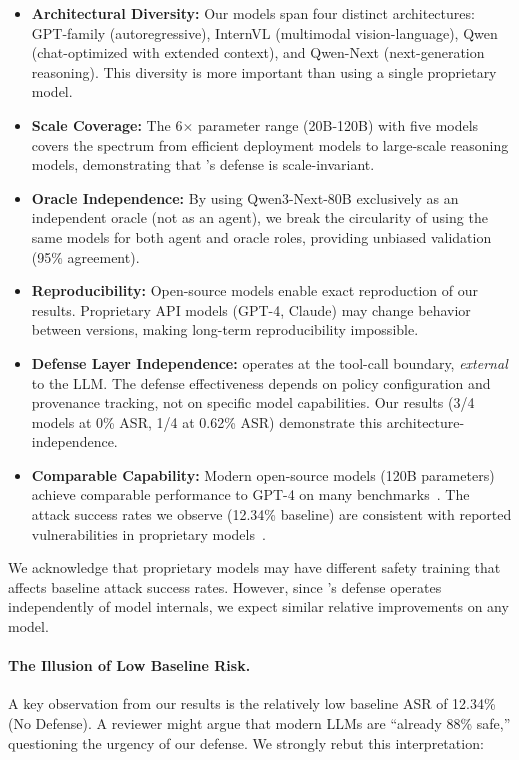 \begin{itemize}[leftmargin=1.2em]
  \item \textbf{Architectural Diversity:} Our models span four distinct architectures: GPT-family (autoregressive), InternVL (multimodal vision-language), Qwen (chat-optimized with extended context), and Qwen-Next (next-generation reasoning). This diversity is more important than using a single proprietary model.
  
  \item \textbf{Scale Coverage:} The 6$\times$ parameter range (20B-120B) with five models covers the spectrum from efficient deployment models to large-scale reasoning models, demonstrating that \sys{}'s defense is scale-invariant.
  
  \item \textbf{Oracle Independence:} By using Qwen3-Next-80B exclusively as an independent oracle (not as an agent), we break the circularity of using the same models for both agent and oracle roles, providing unbiased validation (95\% agreement).
  
  \item \textbf{Reproducibility:} Open-source models enable exact reproduction of our results. Proprietary API models (GPT-4, Claude) may change behavior between versions, making long-term reproducibility impossible.
  
  \item \textbf{Defense Layer Independence:} \sys{} operates at the tool-call boundary, \emph{external} to the LLM. The defense effectiveness depends on policy configuration and provenance tracking, not on specific model capabilities. Our results (3/4 models at 0\% ASR, 1/4 at 0.62\% ASR) demonstrate this architecture-independence.
  
  \item \textbf{Comparable Capability:} Modern open-source models (120B parameters) achieve comparable performance to GPT-4 on many benchmarks~\cite{open-llm-leaderboard}. The attack success rates we observe (12.34\% baseline) are consistent with reported vulnerabilities in proprietary models~\cite{injecagent2024}.
\end{itemize}

We acknowledge that proprietary models may have different safety training that affects baseline attack success rates. However, since \sys{}'s defense operates independently of model internals, we expect similar relative improvements on any model.

\paragraph{The Illusion of Low Baseline Risk.}
A key observation from our results is the relatively low baseline ASR of 12.34\% (No Defense). A reviewer might argue that modern LLMs are ``already 88\% safe,'' questioning the urgency of our defense. We strongly rebut this interpretation:

